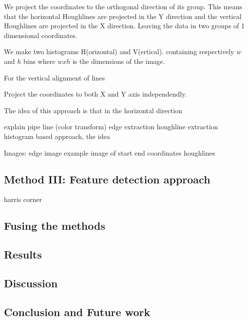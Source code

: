 We project the coordinates to the orthogonal direction of its group. This means
that the horizontal Houghlines are projected in the Y direction and the vertical
Houghlines are projected in the X direction. Leaving the data in two groups of 1
dimensional coordinates.

We make two histograms H(orizontal) and V(ertical). containing respectively $w$
and $h$ bins where $w x h$ is the dimensions of the image.






For the vertical alignment of lines 


Project the coordinates to both X and Y axis independendly.

The idea of this approach is that 
in the horizontal direction


explain pipe line
(color transform)
edge extraction
houghline extraction
histogram based approach, the idea




Images:
edge image
example image of start end coordinates houghlines



\subsection{Method III: Feature detection approach}
	harris corner

\subsection{Fusing the methods}

\subsection{Results}
\subsection{Discussion}  %
\subsection{Conclusion and Future work}




% 
% 
% 
% 
% 
% 
% 
% 
